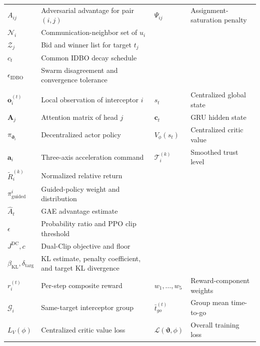 \documentclass[lettersize,journal]{IEEEtran}
\begin{document}
\begin{table}[!hbt]
{\begin{tabular}{@{}
>{\centering\arraybackslash}m{0.70in}
>{\raggedright\arraybackslash}m{0.92in}
>{\centering\arraybackslash}m{0.70in}
>{\raggedright\arraybackslash}m{0.92in}@{}}
$A_{ij}$
& Adversarial advantage for pair $(i,j)$
& $\Psi_{ij}$
& Assignment-saturation penalty \\

$\mathcal{N}_i$
& Communication-neighbor set of $u_i$
& \shortstack{$c_{ij}$\\$\mathcal{Z}_j$}
& Bid and winner list for target $t_j$ \\

$c_t$
& Common IDBO decay schedule
& \shortstack{$\Gamma^{(k)}$\\$\epsilon_{\mathrm{IDBO}}$}
& Swarm disagreement and convergence tolerance \\[2pt]

\multicolumn{4}{@{}l}{\textit{ART-MAPPO cooperative guidance}}\\[1pt]

$\mathbf{o}_i^{(t)}$
& Local observation of interceptor $i$
& $s_t$
& Centralized global state \\

$\mathbf{A}_j$
& Attention matrix of head $j$
& $\mathbf{c}_t$
& GRU hidden state \\

$\pi_{\boldsymbol{\vartheta}_i}$
& Decentralized actor policy
& $V_\phi(s_t)$
& Centralized critic value \\

$\mathbf{a}_i$
& Three-axis acceleration command
& $\mathcal{T}_i^{(k)}$
& Smoothed trust level \\

$\tilde{R}_i^{(k)}$
& Normalized relative return
& \shortstack{$\beta(\mathcal{T}_i)$\\
$\pi_{\mathrm{guided}}^i$}
& Guided-policy weight and distribution \\

$\hat{A}_t$
& GAE advantage estimate
& \shortstack{$r_t(\boldsymbol{\vartheta})$\\$\epsilon$}
& Probability ratio and PPO clip threshold \\

$J^{\mathrm{DC}},c$
& Dual-Clip objective and floor
& \shortstack{$\hat{D}_{\mathrm{KL}}$\\
$\beta_{\mathrm{KL}},\delta_{\mathrm{targ}}$}
& KL estimate, penalty coefficient, and target KL divergence \\

$r_i^{(t)}$
& Per-step composite reward
& $w_1,\ldots,w_5$
& Reward-component weights \\

$\mathcal{G}_i$
& Same-target interceptor group
& $\bar{t}_{go}^{(t)}$
& Group mean time-to-go \\

$L_V(\phi)$
& Centralized critic value loss
& $\mathcal{L}(\boldsymbol{\vartheta},\phi)$
& Overall training loss \\

\bottomrule
\end{tabular}
}
\end{table}
\end{document}
